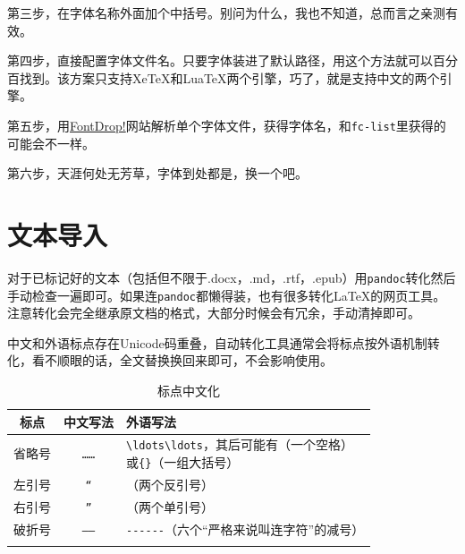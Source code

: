 \documentclass[10pt,openany]{book}
\begin{document}
第三步，在字体名称外面加个中括号。别问为什么，我也不知道，总而言之亲测有效。



第四步，直接配置字体文件名。只要字体装进了默认路径，用这个方法就可以百分百找到。该方案只支持XeTeX和LuaTeX两个引擎，巧了，就是支持中文的两个引擎。



第五步，用\href{https://fontdrop.info}{FontDrop!}网站解析单个字体文件，获得字体名，和\texttt{fc-list}里获得的可能会不一样。

第六步，天涯何处无芳草，字体到处都是，换一个吧。

\chapter{文本导入}

对于已标记好的文本（包括但不限于.docx，.md，.rtf，.epub）用\texttt{pandoc}转化然后手动检查一遍即可。如果连\texttt{pandoc}都懒得装，也有很多转化\LaTeX 的网页工具。注意转化会完全继承原文档的格式，大部分时候会有冗余，手动清掉即可。

中文和外语标点存在Unicode码重叠，自动转化工具通常会将标点按外语机制转化，看不顺眼的话，全文替换换回来即可，不会影响使用。

\begin{center}
    \begin{longtable}{ccl}
        \textbf{标点} & \textbf{中文写法} & \textbf{外语写法}                                                                         \\
        \hline
        \endfirsthead
        省略号         & \texttt{……}   & \makecell[l]{\texttt{\textbackslash{}ldots\textbackslash{}ldots}，其后可能有\texttt{}（一个空格） \\或\texttt{\{\}}（一组大括号）} \\
        \hline
        左引号         & \texttt{“}    & \texttt{\textasciigrave{}\textasciigrave{}}（两个反引号）                                    \\
        \hline
        右引号         & \texttt{”}    & \texttt{\textquotesingle{}\textquotesingle{}}（两个单引号）                                  \\
        \hline
        破折号         & \texttt{——}   & \texttt{-\/-\/-\/-\/-\/-}（六个“严格来说叫连字符”的减号）                                            \\
        \hline
        \caption{标点中文化}
    \end{longtable}
\end{center}
\end{document}
